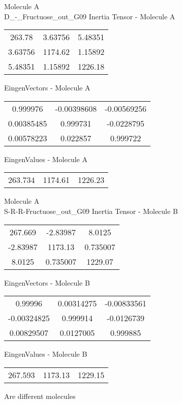 \newpage
\begin{multicols}{2}
\begin{center}
Molecule A \\ 
D_-_Fructuose_out_G09
Inertia Tensor - Molecule A \\
\vtab
\begin{tabular}{|c c c|}
263.78	 & 	3.63756	 & 	5.48351	 \\
3.63756	 & 	1174.62	 & 	1.15892	 \\
5.48351	 & 	1.15892	 & 	1226.18
\end{tabular}

\vtab
 EingenVectors - Molecule A     \\
\vtab
\begin{tabular}{|c c c|}
0.999976	 & 	-0.00398608	 & 	-0.00569256	 \\
0.00385485	 & 	0.999731	 & 	-0.0228795	 \\
0.00578223	 & 	0.022857	 & 	0.999722
\end{tabular}

\vtab
 EingenValues - Molecule A     \\
\vtab
\begin{tabular}{|c c c|}
263.734	 & 	1174.61	 & 	1226.23
\end{tabular}
\columnbreak
Molecule A \\ 
S-R-R-Fructuose_out_G09
Inertia Tensor - Molecule B \\
\vtab
\begin{tabular}{|c c c|}
267.669	 & 	-2.83987	 & 	8.0125	 \\
-2.83987	 & 	1173.13	 & 	0.735007	 \\
8.0125	 & 	0.735007	 & 	1229.07
\end{tabular}

\vtab
 EingenVectors - Molecule B     \\
\vtab
\begin{tabular}{|c c c|}
0.99996	 & 	0.00314275	 & 	-0.00833561	 \\
-0.00324825	 & 	0.999914	 & 	-0.0126739	 \\
0.00829507	 & 	0.0127005	 & 	0.999885
\end{tabular}

\vtab
 EingenValues - Molecule B     \\
\vtab
\begin{tabular}{|c c c|}
267.593	 & 	1173.13	 & 	1229.15
\end{tabular}
\textcolor{NavyBlue}{\large Are different molecules}
\end{center}
\end{multicols}
